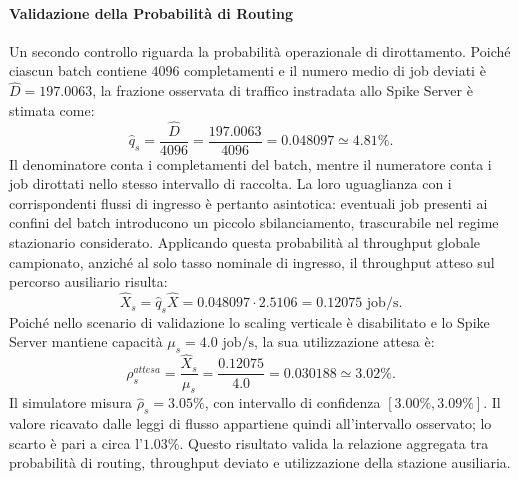 ﻿\documentclass[a4paper,12pt]{article}
\begin{document}
\paragraph{Validazione della Probabilità di Routing}
Un secondo controllo riguarda la probabilità operazionale di dirottamento. Poiché ciascun batch contiene $4096$ completamenti e il numero medio di job deviati è $\hat{D}=197.0063$, la frazione osservata di traffico instradata allo Spike Server è stimata come:
\begin{equation}
    \hat{q}_s=\frac{\hat{D}}{4096}
    =\frac{197.0063}{4096}
    =0.048097 \simeq 4.81\%.
\end{equation}
Il denominatore conta i completamenti del batch, mentre il numeratore conta i job dirottati nello stesso intervallo di raccolta. La loro uguaglianza con i corrispondenti flussi di ingresso è pertanto asintotica: eventuali job presenti ai confini del batch introducono un piccolo sbilanciamento, trascurabile nel regime stazionario considerato.
Applicando questa probabilità al throughput globale campionato, anziché al solo tasso nominale di ingresso, il throughput atteso sul percorso ausiliario risulta:
\begin{equation}
    \hat{X}_s=\hat{q}_s\hat{X}
    =0.048097\cdot 2.5106
    =0.12075\text{ job/s}.
\end{equation}
Poiché nello scenario di validazione lo scaling verticale è disabilitato e lo Spike Server mantiene capacità $\mu_s=4.0\text{ job/s}$, la sua utilizzazione attesa è:
\begin{equation}
    \rho_s^{attesa}=\frac{\hat{X}_s}{\mu_s}
    =\frac{0.12075}{4.0}
    =0.030188 \simeq 3.02\%.
\end{equation}
Il simulatore misura $\hat{\rho}_s=3.05\%$, con intervallo di confidenza $[3.00\%,3.09\%]$. Il valore ricavato dalle leggi di flusso appartiene quindi all'intervallo osservato; lo scarto è pari a circa l'$1.03\%$. Questo risultato valida la relazione aggregata tra probabilità di routing, throughput deviato e utilizzazione della stazione ausiliaria.
\end{document}
